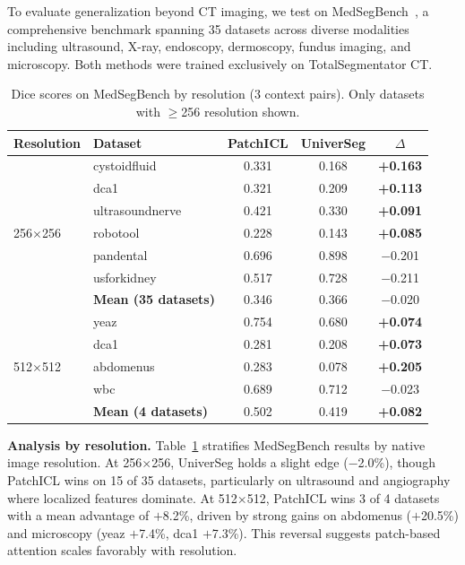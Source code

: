 \documentclass[runningheads]{llncs}
\begin{document}
To evaluate generalization beyond CT imaging, we test on MedSegBench~\cite{kusMedSegBenchComprehensiveBenchmark2024}, a comprehensive benchmark spanning 35 datasets across diverse modalities including ultrasound, X-ray, endoscopy, dermoscopy, fundus imaging, and microscopy. Both methods were trained exclusively on TotalSegmentator CT.


\begin{table}[t]
\centering
\caption{Dice scores on MedSegBench by resolution (3 context pairs). Only datasets with $\geq$256 resolution shown.}\label{tab:medsegbench_resolution}
\small
\begin{tabular}{llccc}
\toprule
Resolution & Dataset & PatchICL & UniverSeg & $\Delta$ \\
\midrule
\multirow{7}{*}{256$\times$256}
& cystoidfluid    & 0.331 & 0.168 & \textbf{+0.163} \\
& dca1            & 0.321 & 0.209 & \textbf{+0.113} \\
& ultrasoundnerve & 0.421 & 0.330 & \textbf{+0.091} \\
& robotool        & 0.228 & 0.143 & \textbf{+0.085} \\
& pandental       & 0.696 & 0.898 & $-$0.201 \\
& usforkidney     & 0.517 & 0.728 & $-$0.211 \\
& \textbf{Mean (35 datasets)} & 0.346 & 0.366 & $-$0.020 \\
\midrule
\multirow{5}{*}{512$\times$512}
& yeaz            & 0.754 & 0.680 & \textbf{+0.074} \\
& dca1            & 0.281 & 0.208 & \textbf{+0.073} \\
& abdomenus       & 0.283 & 0.078 & \textbf{+0.205} \\
& wbc             & 0.689 & 0.712 & $-$0.023 \\
& \textbf{Mean (4 datasets)} & 0.502 & 0.419 & \textbf{+0.082} \\
\bottomrule
\end{tabular}
\end{table}

\textbf{Analysis by resolution.} Table~\ref{tab:medsegbench_resolution} stratifies MedSegBench results by native image resolution. At 256$\times$256, UniverSeg holds a slight edge ($-$2.0\%), though PatchICL wins on 15 of 35 datasets, particularly on ultrasound and angiography where localized features dominate. At 512$\times$512, PatchICL wins 3 of 4 datasets with a mean advantage of $+$8.2\%, driven by strong gains on abdomenus ($+$20.5\%) and microscopy (yeaz $+$7.4\%, dca1 $+$7.3\%). This reversal suggests patch-based attention scales favorably with resolution.
\end{document}
